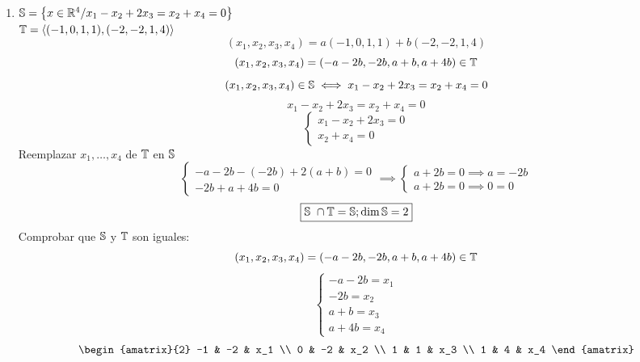 \documentclass[../practica.root.tex]{subfiles}
\begin{document}
\begin{enumerate}
\begin{enumerate}
              \item $\S = \left\{ x \in \R^4 / x_1 - x_2 + 2x_3 = x_2 + x_4 = 0 \right\}$ \\ $\T = \langle (-1,0,1,1),(-2,-2,1,4) \rangle$
                    \[ (x_1, x_2, x_3, x_4) = a(-1,0,1,1) + b(-2,-2,1,4) \]
                    \[ (x_1, x_2, x_3, x_4) = (-a-2b, -2b, a+b, a+4b) \in \T \]
                    \[ (x_1, x_2, x_3, x_4) \in \S \iff x_1 - x_2 + 2x_3 = x_2 + x_4 = 0  \]
                    \[ x_1 - x_2 + 2x_3 = x_2 + x_4 = 0 \]
                    \[ \begin{cases}
                            x_1 - x_2 + 2x_3 = 0 \\
                            x_2 + x_4 = 0
                        \end{cases} \]
                    Reemplazar $x_1, \dots, x_4$ de $\T$ en $\S$
                    \[
                        \begin{cases}
                            -a-2b - (-2b) + 2(a+b) = 0 \\
                            -2b + a+4b = 0
                        \end{cases}
                        \implies
                        \begin{cases}
                            a + 2b = 0 \implies a = -2b \\
                            a + 2b = 0 \implies 0 = 0
                        \end{cases}
                    \]
                    \[ \boxed{\S \cap \T = \S; \dim\S = 2} \]
                    Comprobar que $\S$ y $\T$ son iguales:
                    \[ (x_1, x_2, x_3, x_4) = (-a-2b, -2b, a+b, a+4b) \in \T \]
                    \[
                        \begin{cases}
                            -a - 2b = x_1 \\
                            -2b = x_2     \\
                            a + b = x_3   \\
                            a + 4b = x_4
                        \end{cases}
                    \] \[
                        \begin{amatrix}{2}
                            -1 & -2 & x_1 \\
                            0 & -2 & x_2 \\
                            1 & 1 & x_3 \\
                            1 & 4 & x_4

\end{amatrix}\]
\end{enumerate}
\end{enumerate}
\end{document}
